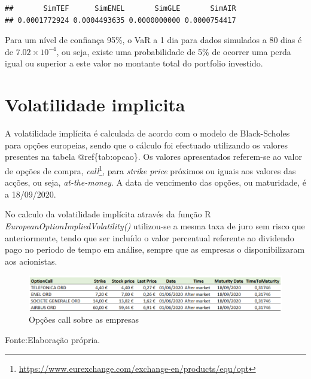 \documentclass[
  12pt,
  a4paper,
  openany]{book}
\begin{document}
\begin{verbatim}
##       SimTEF      SimENEL       SimGLE       SimAIR 
## 0.0001772924 0.0004493635 0.0000000000 0.0000754417
\end{verbatim}

Para um nível de confiança 95\%, o VaR a 1 dia para dados simulados a 80 dias é de \ensuremath{7.02\times 10^{-4}}, ou seja, existe uma probabilidade de 5\% de ocorrer uma perda igual ou superior a este valor no montante total do portfolio investido.

\hypertarget{volatilidade-implicita}{%
\section{Volatilidade implicita}\label{volatilidade-implicita}}

A volatilidade implícita é calculada de acordo com o modelo de Black-Scholes para opções europeias, sendo que o cálculo foi efectuado utilizando os valores presentes na tabela @ref\{tab:opcao\}. Os valores apresentados referem-se ao valor de opções de compra, \emph{call}\footnote{\url{https://www.eurexchange.com/exchange-en/products/equ/opt}}, para \emph{strike price} próximos ou iguais aos valores das acções, ou seja, \emph{at-the-money}. A data de vencimento das opções, ou maturidade, é a 18/09/2020.

No calculo da volatilidade implícita através da função R \emph{EuropeanOptionImpliedVolatility()} utilizou-se a mesma taxa de juro sem risco que anteriormente, tendo que ser incluído o valor percentual referente ao dividendo pago no periodo de tempo em análise, sempre que as empresas o disponibilizaram aos acionistas.

\begin{figure}

{\centering \includegraphics[width=1\linewidth]{image/opcao} 

}

\caption{Opções call sobre as empresas }\label{fig:opcao}
\end{figure}
\FloatBarrier
\centering

Fonte:Elaboração própria.

\justifying
\bigskip

\scriptsize
\end{document}
